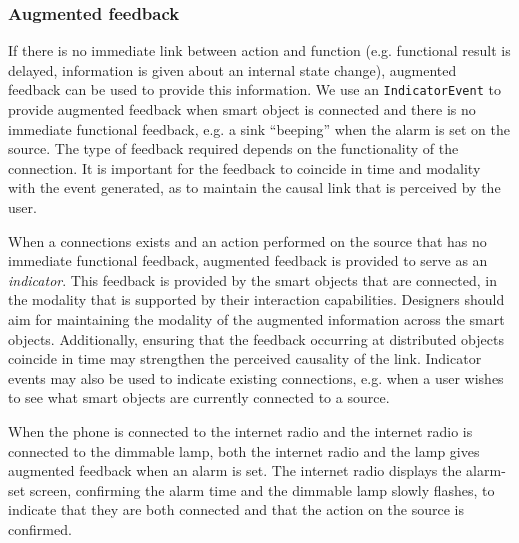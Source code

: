 \subsubsection{Augmented feedback} 
If there is no immediate link between action and function  (e.g. functional result is delayed, information is given about an internal state change), augmented feedback can be used to provide this information. We use an \texttt{IndicatorEvent} to provide augmented feedback when smart object is connected and there is no immediate functional feedback, e.g. a sink ``beeping'' when the alarm is set on the source.  The type of feedback required depends on the functionality of the connection. It is important for the feedback to coincide in time and modality with the event generated, as to maintain the causal link that is perceived by the user.

When a connections exists and an action performed on the source that has no immediate functional feedback, augmented feedback is provided to serve as an \emph{indicator}. This feedback is  provided by the smart objects that are connected, in the modality that is supported by their interaction capabilities. Designers should aim for maintaining the modality of the augmented information across the smart objects. Additionally, ensuring that the feedback occurring at distributed objects coincide in time may strengthen the perceived causality of the link. Indicator events may also be used to indicate existing connections, e.g. when a user wishes to see what smart objects are currently connected to a source.  

\begin{example}
When the phone is connected to the internet radio and the internet radio is connected to the dimmable lamp, both the internet radio and the lamp gives augmented feedback when an alarm is set. The internet radio displays the alarm-set screen, confirming the alarm time and the dimmable lamp slowly flashes, to indicate that they are both connected and that the action on the source is confirmed.
\end{example}





